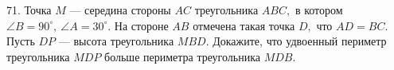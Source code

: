 71. Точка $M$ --- середина стороны $AC$ треугольника $ABC,$ в котором $\angle B=90^\circ,\ \angle A=30^{\circ}.$ На стороне $AB$ отмечена такая точка $D,$ что $AD=BC.$ Пусть $DP$ --- высота треугольника $MBD.$ Докажите, что удвоенный периметр треугольника $MDP$ больше периметра треугольника $MDB.$\\
